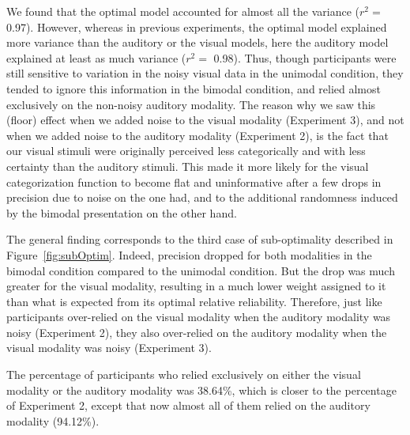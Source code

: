 \documentclass[english,man]{apa6}
\theoremstyle{definition}
\theoremstyle{definition}
\theoremstyle{definition}
\theoremstyle{remark}
\begin{document}
We found that the optimal model accounted for almost all the variance
(\(r^2 =\) 0.97). However, whereas in previous experiments, the optimal
model explained more variance than the auditory or the visual models,
here the auditory model explained at least as much variance (\(r^2 =\)
0.98). Thus, though participants were still sensitive to variation in
the noisy visual data in the unimodal condition, they tended to ignore
this information in the bimodal condition, and relied almost exclusively
on the non-noisy auditory modality. The reason why we saw this (floor)
effect when we added noise to the visual modality (Experiment 3), and
not when we added noise to the auditory modality (Experiment 2), is the
fact that our visual stimuli were originally perceived less
categorically and with less certainty than the auditory stimuli. This
made it more likely for the visual categorization function to become
flat and uninformative after a few drops in precision due to noise on
the one had, and to the additional randomness induced by the bimodal
presentation on the other hand.

The general finding corresponds to the third case of sub-optimality
described in Figure~\ref{fig:subOptim}. Indeed, precision dropped for
both modalities in the bimodal condition compared to the unimodal
condition. But the drop was much greater for the visual modality,
resulting in a much lower weight assigned to it than what is expected
from its optimal relative reliability. Therefore, just like participants
over-relied on the visual modality when the auditory modality was noisy
(Experiment 2), they also over-relied on the auditory modality when the
visual modality was noisy (Experiment 3).

The percentage of participants who relied exclusively on either the
visual modality or the auditory modality was 38.64\%, which is closer to
the percentage of Experiment 2, except that now almost all of them
relied on the auditory modality (94.12\%).
\end{document}
